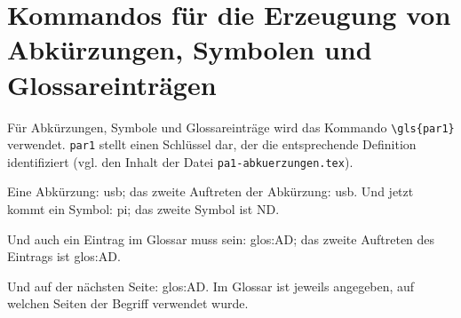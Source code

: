 %
%
%
\section{Kommandos f\"ur die Erzeugung von Abk\"urzungen, Symbolen und Glos\-sar\-eint\-r\"a\-gen}

F\"ur Abk\"urzungen, Symbole und Glossareintr\"age wird das Kommando \verb+\gls{par1}+ verwendet.
\texttt{par1} stellt einen Schl\"ussel dar, der die entsprechende Definition identifiziert (vgl. den Inhalt der Datei
\texttt{pa1-abkuerzungen.tex}). 


Eine Abk\"urzung: \gls{usb}; das zweite Auftreten der Abk\"urzung: \gls{usb}. 
Und jetzt kommt ein Symbol: \gls{pi}; das zweite Symbol ist \gls{ND}.

Und auch ein Eintrag im Glossar muss sein: \gls{glos:AD}; das zweite Auftreten des Eintrags ist \gls{glos:AD}.

\newpage
Und auf der n\"achsten Seite: \gls{glos:AD}. Im Glossar ist jeweils angegeben, auf welchen Seiten der 
Begriff verwendet wurde.
